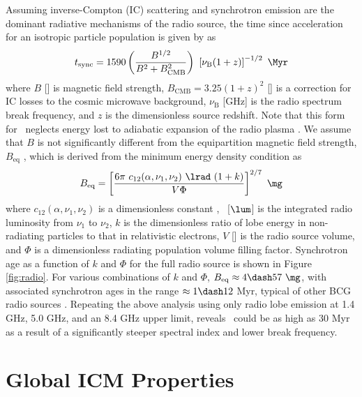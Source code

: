 \documentclass[useAMS,usenatbib]{mn2e}
\begin{document}
Assuming inverse-Compton (IC) scattering and synchrotron emission are
the dominant radiative mechanisms of the radio source, the time since
acceleration for an isotropic particle population is given by
\citet{2001AJ....122.1172S} as
\begin{equation}
  \tsync = 1590 \left(\frac{B^{1/2}}{B^2 + B_{\mathrm{CMB}}^2}\right)~
  \left[\nu_{\mathrm{B}} (1+z)\right]^{-1/2} ~\Myr
\end{equation}
where $B$ [\mg] is magnetic field strength, $B_{\mathrm{CMB}} =
3.25(1+z)^2$ [\mg] is a correction for IC losses to the cosmic
microwave background, $\nu_{\mathrm{B}}$ [GHz] is the radio spectrum
break frequency, and $z$ is the dimensionless source redshift. Note
that this form for \tsync\ neglects energy lost to adiabatic expansion
of the radio plasma \citep{1968ARA&A...6..321S}. We assume that $B$ is
not significantly different from the equipartition magnetic field
strength, $B_{\mathrm{eq}}$ \citep[see][for thorough discussion of the
  validity and shortcomings of this assumption]{birzan08}, which is
derived from the minimum energy density condition as
\citep{1980ARA&A..18..165M}
\begin{equation}
  B_{\mathrm{eq}} = \left[\frac{6 \pi ~c_{12}(\alpha,\nu_1, \nu_2)
      ~\lrad ~(1+k)}{V \Phi}\right]^{2/7} ~\mathrm{\mg}
\end{equation}
where $c_{12}(\alpha,\nu_1,\nu_2)$ is a dimensionless constant
\citep{pach}, \lrad\ [$\lum$] is the integrated radio luminosity from
$\nu_1$ to $\nu_2$, $k$ is the dimensionless ratio of lobe energy in
non-radiating particles to that in relativistic electrons, $V$ [\cc]
is the radio source volume, and $\Phi$ is a dimensionless radiating
population volume filling factor. Synchrotron age as a function of $k$
and $\Phi$ for the full radio source is shown in Figure
\ref{fig:radio}. For various combinations of $k$ and $\Phi$,
$B_{\mathrm{eq}} \approx 4 \dash 57 ~\mg$, with associated synchrotron
ages in the range $\approx 1 \dash 12$ Myr, typical of other BCG radio
sources \citep[\eg][]{birzan08}. Repeating the above analysis using
only radio lobe emission at 1.4 GHz, 5.0 GHz, and an 8.4 GHz upper
limit, reveals \tsync\ could be as high as $30$ Myr as a result of a
significantly steeper spectral index and lower break frequency.

\section{Global ICM Properties}
\label{sec:global}
\end{document}
